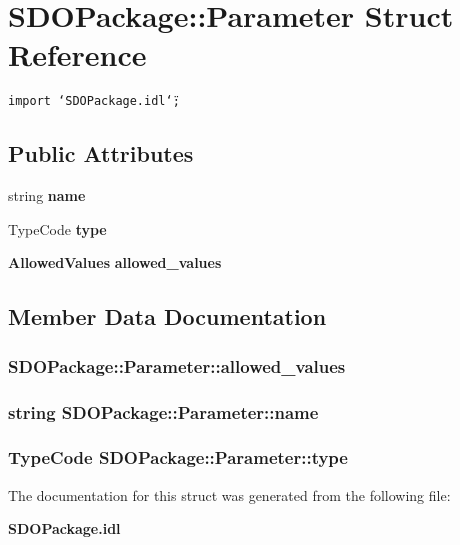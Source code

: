 \section{SDOPackage::Parameter Struct Reference}
\label{structSDOPackage_1_1Parameter}
{\tt import \char`\"{}SDOPackage.idl\char`\"{};}

\subsection*{Public Attributes}
\begin{CompactItemize}
\item 
string {\bf name}
\item 
Type\-Code {\bf type}
\item 
{\bf Allowed\-Values} {\bf allowed\_\-values}
\end{CompactItemize}


\subsection{Member Data Documentation}
\subsubsection{ {\bf SDOPackage::Parameter::allowed\_\-values}}\label{structSDOPackage_1_1Parameter_SDOPackage_1_1Parametero2}


\subsubsection{\setlength{\rightskip}{0pt plus 5cm}string {\bf SDOPackage::Parameter::name}}\label{structSDOPackage_1_1Parameter_SDOPackage_1_1Parametero0}


\subsubsection{\setlength{\rightskip}{0pt plus 5cm}Type\-Code {\bf SDOPackage::Parameter::type}}\label{structSDOPackage_1_1Parameter_SDOPackage_1_1Parametero1}




The documentation for this struct was generated from the following file:\begin{CompactItemize}
\item 
{\bf SDOPackage.idl}\end{CompactItemize}
